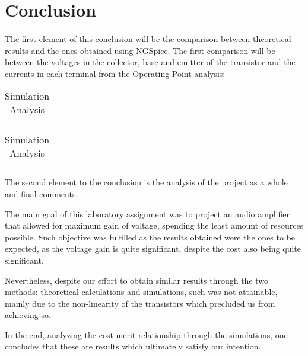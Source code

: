 \section{Conclusion}
\label{sec:conclusion}
\paragraph{}
\par The first element of this conclusion will be the comparison between theoretical results and the ones obtained using NGSpice. The first comparison will be between the voltages in the collector, base and emitter of the transistor and the currents in each terminal from the Operating Point analysis: 

\begin{table}[H]
	\begin{minipage}{.5\linewidth}
		\centering
		\begin{tabular}{|c|c|}
		\hline
		
		\end{tabular}
		\caption{Theoretical Analysis}
		\label{table1a}
	\end{minipage}
	\begin{minipage}{.5\linewidth}
		\centering
		\begin{tabular}{|c|c|}
		\hline
		
		
		
	\end{tabular}
		\caption{Simulation Analysis}
		\label{table1b}
	\end{minipage} 
\end{table}

\par The second element to the conclusion is the analysis of the project as a whole and final comments:
\par The main goal of this laboratory assignment was to project an audio amplifier that allowed for maximum gain of voltage, spending the least amount of resources possible. Such objective was fulfilled as the results obtained were the ones to be expected, as the voltage gain is quite significant, despite the cost also being quite significant.
\par Nevertheless, despite our effort to obtain similar results through the two methods: theoretical calculations and simulations, such was not attainable, mainly due to the non-linearity of the transistors which precluded us from achieving so.
\par In the end, analyzing the cost-merit relationship through the simulations, one concludes that these are results which ultimately satisfy our intention.






